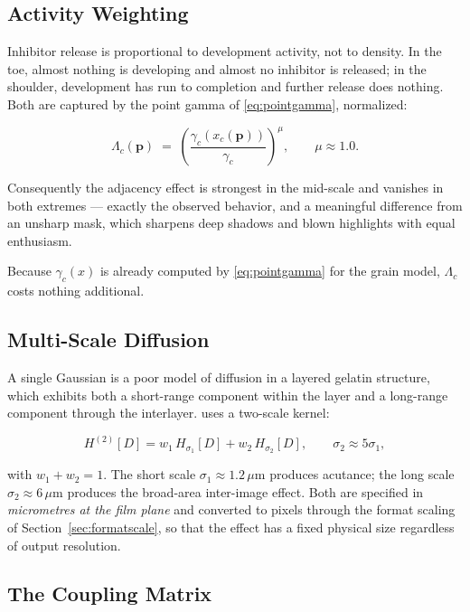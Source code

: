 \subsection{Activity Weighting}

Inhibitor release is proportional to development activity, not to density. In
the toe, almost nothing is developing and almost no inhibitor is released; in
the shoulder, development has run to completion and further release does
nothing. Both are captured by the point gamma of
\eqref{eq:pointgamma}, normalized:

\begin{equation}
\Lambda_c(\mathbf{p}) \;=\; \left(\frac{\gamma_c(x_c(\mathbf{p}))}{\gamma_c}\right)^{\!\mu},
\qquad \mu \approx 1.0.
\label{eq:activityweight}
\end{equation}

Consequently the adjacency effect is strongest in the mid-scale and vanishes in
both extremes --- exactly the observed behavior, and a meaningful difference
from an unsharp mask, which sharpens deep shadows and blown highlights with
equal enthusiasm.

Because $\gamma_c(x)$ is already computed by \eqref{eq:pointgamma} for the grain
model, $\Lambda_c$ costs nothing additional.

\subsection{Multi-Scale Diffusion}

A single Gaussian is a poor model of diffusion in a layered gelatin structure,
which exhibits both a short-range component within the layer and a long-range
component through the interlayer. \EM{} uses a two-scale kernel:

\begin{equation}
H^{(2)}[D] = w_1\,H_{\sigma_1}[D] + w_2\,H_{\sigma_2}[D],
\qquad \sigma_2 \approx 5\sigma_1,
\label{eq:twoscale}
\end{equation}

with $w_1 + w_2 = 1$. The short scale $\sigma_1 \approx 1.2\,\mu\mathrm{m}$
produces acutance; the long scale $\sigma_2 \approx 6\,\mu\mathrm{m}$ produces
the broad-area inter-image effect. Both are specified in \emph{micrometres at
the film plane} and converted to pixels through the format scaling of
Section~\ref{sec:formatscale}, so that the effect has a fixed physical size
regardless of output resolution.

\subsection{The Coupling Matrix}

